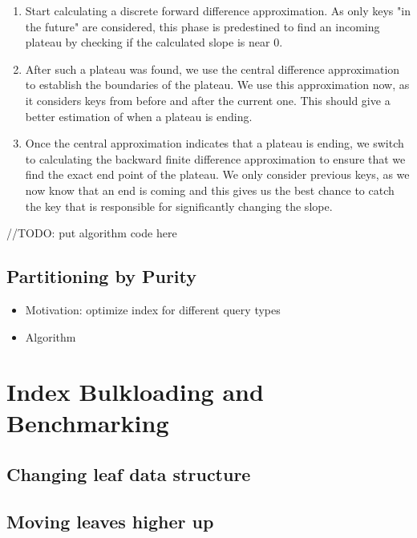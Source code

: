 \begin{enumerate}
    \item Start calculating a discrete forward difference approximation. As only keys "in the future" are considered, this phase is predestined to find an incoming plateau by checking if the calculated slope is near 0.
    \item After such a plateau was found, we use the central difference approximation to establish the boundaries of the plateau. We use this approximation now, as it considers keys from before and after the current one. This should give a better estimation of when a plateau is ending.
    \item Once the central approximation indicates that a plateau is ending, we switch to calculating the backward finite difference approximation to ensure that we find the exact end point of the plateau. We only consider previous keys, as we now know that an end is coming and this gives us the best chance to catch the key that is responsible for significantly changing the slope.
\end{enumerate}

//TODO: put algorithm code here

\subsection{Partitioning by Purity} \label{sec:purity}
\begin{itemize}
    \item Motivation: optimize index for different query types
    \item Algorithm
\end{itemize}

\section{Index Bulkloading and Benchmarking}
\subsection{Changing leaf data structure}
\subsection{Moving leaves higher up}
